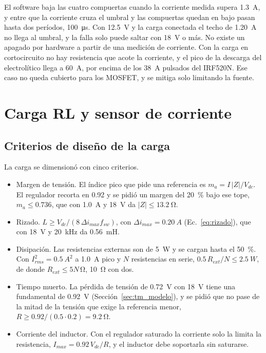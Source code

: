 \documentclass[journal]{IEEEtran}
\begin{document}
El software baja las cuatro compuertas cuando la corriente medida supera \SI{1.3}{A}, y entre que la corriente cruza el umbral y las compuertas quedan en bajo pasan hasta dos períodos, \SI{100}{\micro s}. Con \SI{12.5}{V} y la carga conectada el techo de \SI{1.20}{A} no llega al umbral, y la falla solo puede saltar con \SI{18}{V} o más. No existe un apagado por hardware a partir de una medición de corriente. Con la carga en cortocircuito no hay resistencia que acote la corriente, y el pico de la descarga del electrolítico llega a \SI{60}{A}, por encima de los \SI{38}{A} pulsados del IRF520N. Ese caso no queda cubierto para los MOSFET, y se mitiga solo limitando la fuente.

\section{Carga RL y sensor de corriente}
\label{sec:carga}

\subsection{Criterios de diseño de la carga}
\label{sec:criterios}
La carga se dimensionó con cinco criterios.

\begin{itemize}
	\item Margen de tensión. El índice pico que pide una referencia es $m_a=I\,|Z|/V_{dc}$. El regulador recorta en \num{0.92} y se pidió un margen del \SI{20}{\percent} bajo ese tope, $m_a\le0.736$, que con \SI{1.0}{A} y \SI{18}{V} da $|Z|\le\SI{13.2}{\ohm}$.
	\item Rizado. $L\ge V_{dc}/(8\,\Delta i_{max}f_{sw})$, con $\Delta i_{max}=\SI{0.20}{A}$ (Ec.~\ref{eq:rizado}), que con \SI{18}{V} y \SI{20}{kHz} da \SI{0.56}{mH}.
	\item Disipación. Las resistencias externas son de \SI{5}{W} y se cargan hasta el \SI{50}{\percent}. Con $I_{rms}^2=\SI{0.5}{A^2}$ a \SI{1.0}{A} pico y $N$ resistencias en serie, $0.5\,R_{ext}/N\le\SI{2.5}{W}$, de donde $R_{ext}\le5N\,\si{\ohm}$, \SI{10}{\ohm} con dos.
	\item Tiempo muerto. La pérdida de tensión de \SI{0.72}{V} con \SI{18}{V} tiene una fundamental de \SI{0.92}{V} (Sección~\ref{sec:tm_modelo}), y se pidió que no pase de la mitad de la tensión que exige la referencia menor, $R\ge0.92/(0.5\cdot0.2)=\SI{9.2}{\ohm}$.
	\item Corriente del inductor. Con el regulador saturado la corriente solo la limita la resistencia, $I_{max}=0.92\,V_{dc}/R$, y el inductor debe soportarla sin saturarse.
\end{itemize}
\end{document}
